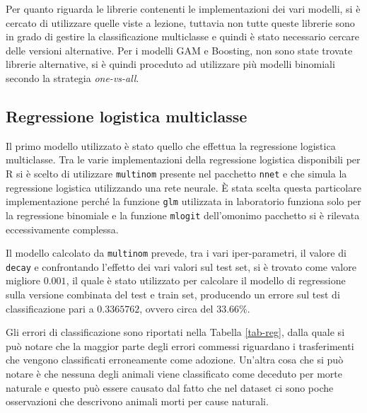 Per quanto riguarda le librerie contenenti le implementazioni dei vari modelli, si è cercato di utilizzare quelle viste a lezione, tuttavia non tutte queste librerie sono in grado di gestire la classificazione multiclasse e quindi è stato necessario cercare delle versioni alternative. Per i modelli GAM e Boosting, non sono state trovate librerie alternative, si è quindi proceduto ad utilizzare più modelli binomiali secondo la strategia \textit{one-vs-all}.


\subsection{Regressione logistica multiclasse}

Il primo modello utilizzato è stato quello che effettua la regressione logistica multiclasse. Tra le varie implementazioni della regressione logistica disponibili per R si è scelto di utilizzare \texttt{multinom} presente nel pacchetto \texttt{nnet} e che simula la regressione logistica utilizzando una rete neurale. \`E stata scelta questa particolare implementazione perché la funzione \texttt{glm} utilizzata in laboratorio funziona solo per la regressione binomiale e la funzione \texttt{mlogit} dell'omonimo pacchetto si è rilevata eccessivamente complessa.

Il modello calcolato da \texttt{multinom} prevede, tra i vari iper-parametri, il valore di \texttt{decay} e confrontando l'effetto dei vari valori sul test set, si è trovato come valore migliore $0.001$, il quale è stato utilizzato per calcolare il modello di regressione sulla versione combinata del test e train set, producendo un errore sul test di classificazione pari a $0.3365762$, ovvero circa del $33.66\%$.

Gli errori di classificazione sono riportati nella Tabella \ref{tab-reg}, dalla quale si può notare che la maggior parte degli errori commessi riguardano i trasferimenti che vengono classificati erroneamente come adozione. Un'altra cosa che si può notare è che nessuna degli animali viene classificato come deceduto per morte naturale e questo può essere causato dal fatto che nel dataset ci sono poche osservazioni che descrivono animali morti per cause naturali.

